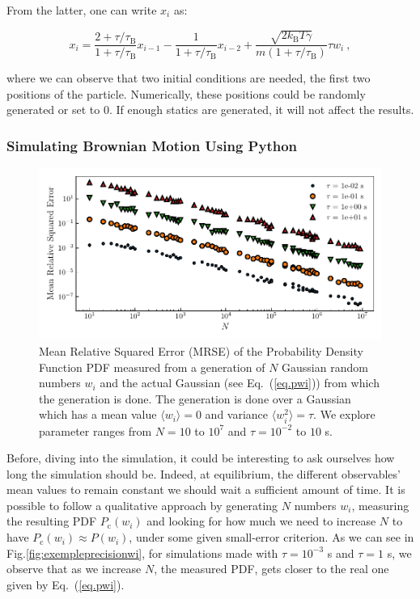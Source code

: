 From the latter, one can write $x_i$ as:

\begin{equation} 
	x_i = \frac{2 + \tau /\tau_\mathrm{B}}{1 + \tau / \tau_\mathrm{B} } x_{i-1} 
	- \frac{1}{1 + \tau / \tau_\mathrm{B}}x_{i-2}
	+ \frac{\sqrt{2k_\mathrm{B}T\gamma}}{m(1 + \tau/\tau_\mathrm{B})} \tau w_i ~,
	\label{Eq.numfulllangevin}
\end{equation}

where we can observe that two initial conditions are needed, the first two positions of the particle. Numerically, these positions could be randomly generated or  set to $0$. If enough statics are generated, it will not affect the results.

\subsubsection{Simulating Brownian Motion Using Python}

\begin{figure}[h]
	\centering
	\includegraphics{02_body/chapter1/image/noise_simulation/MSE.pdf}
	\caption{Mean Relative Squared Error (\gls{MRSE}) of the Probability Density Function \gls{PDF} measured from a generation of $N$ Gaussian random numbers $w_i$ and the actual Gaussian (see Eq.~(\ref{eq.pwi})) from which the generation is done. The generation is done over a Gaussian which has a mean value $\langle w_i \rangle =0$ and variance $\langle w_i^2 \rangle = \tau$. We explore parameter ranges from $N = 10$ to $10^7$ and $\tau = 10^{-2}$ to $10$ s. \href{https://github.com/eXpensia/Confined-Brownian-Motion/blob/main/02_body/chapter1/image/noise_simulation/noise_simulation.ipynb}{\faGithub}}  
	\label{fig:MSEwi}
\end{figure}

Before, diving into the simulation, it could be interesting to ask ourselves how long the simulation should be. Indeed, at equilibrium, the different observables' mean values to remain constant we should wait a sufficient amount of time. It is possible to follow a qualitative approach by generating $N$ numbers $w_i$, measuring the resulting \gls{PDF} $P_\mathrm{c}(w_i)$ and looking for how much we need to increase $N$ to have $P_\mathrm{c}(w_i) \approx P(w_i)$, under some given small-error criterion. As we can see in Fig.\ref{fig:exempleprecisionwi}, for simulations made with $\tau = 10^{-3}$ s and $\tau = 1$ s, we observe that as we increase $N$, the measured PDF, gets closer to the real one given by Eq.~(\ref{eq.pwi}). 




